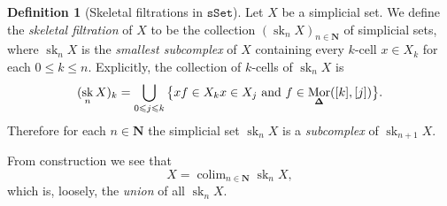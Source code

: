 \documentclass[11pt, reqno]{amsart}
\theoremstyle{definition}
\newtheorem{definition}[theorem]{Definition}
\newtheorem{remark}[theorem]{Remark}
\renewcommand{\leq}{\leqslant}
\let\colon\relax
\newcommand{\mono}{\rightarrowtail}
\newcommand{\iso}{\simeq}
\newcommand{\arrowiso}{\iso}
\newcommand{\dis}{\iso}
\newcommand{\nat}{\Rightarrow}
\newcommand{\isonat}{\xRightarrow{\raisebox{-.6ex}[0ex][0ex]{\(\arrowiso\)}}}
\DeclareMathOperator{\Colim}{colim} %
\newcommand{\N}{\mathbf{N}}
\newcommand{\catfont}{\texttt}
\newcommand{\Set}{{\catfont{Set}}}          %
\DeclareMathOperator{\Hom}{Mor}   %
\newcommand{\Splx}{{\mathbf{\Delta}}}           %
\newcommand{\sSet}{{\catfont{sSet}}}            %
\DeclareMathOperator{\Sk}{sk} %
\begin{document}
\begin{definition}[Skeletal filtrations in \(\sSet\)]
\label{def:skeletal-filtration-sset}
Let \(X\) be a simplicial set. We define the \emph{skeletal filtration} of \(X\)
to be the collection \((\Sk_n X)_{n \in \N}\) of simplicial sets, where
\(\Sk_n X\) is the \emph{smallest subcomplex} of \(X\) containing every
\(k\)-cell \(x \in X_k\) for each \(0 \leq k \leq n\). Explicitly, the
collection of \(k\)-cells of \(\Sk_n X\) is
\[
(\Sk_n X)_k = \bigcup_{0 \leq j \leq k}
\big\{ x f \in X_k
\colon x \in X_j
\text{ and }
f \in \Hom_{\Splx}([k], [j])\big\}.
\]
Therefore for each \(n \in \N\) the simplicial set \(\Sk_n X\) is a
\emph{subcomplex} of \(\Sk_{n+1} X\).

From construction we see that
\[
X = \Colim_{n \in \N} \Sk_n X,
\]
which is, loosely, the \emph{union} of all \(\Sk_n X\).
\end{definition}

\end{document}
